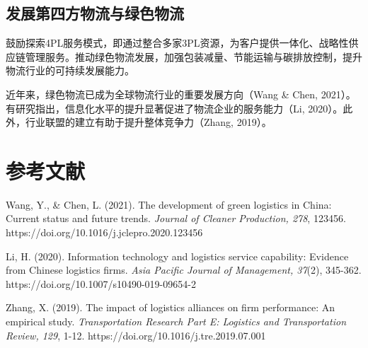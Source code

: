 \documentclass[UTF-8]{CUFEpaper}
\begin{document}
\subsection{发展第四方物流与绿色物流}
鼓励探索4PL服务模式，即通过整合多家3PL资源，为客户提供一体化、战略性供应链管理服务。推动绿色物流发展，加强包装减量、节能运输与碳排放控制，提升物流行业的可持续发展能力。\par
近年来，绿色物流已成为全球物流行业的重要发展方向（Wang \& Chen, 2021）。有研究指出，信息化水平的提升显著促进了物流企业的服务能力（Li, 2020）。此外，行业联盟的建立有助于提升整体竞争力（Zhang, 2019）。

\clearpage
{}
{}  %

\section*{参考文献}
\begingroup
\renewcommand{\section}[2]{} %
\begin{thebibliography}{99}
\makeatletter
\renewcommand{\@biblabel}[1]{[#1]. }
\makeatother
\vspace{12pt}

Wang, Y., \& Chen, L. (2021). The development of green logistics in China: Current status and future trends. \textit{Journal of Cleaner Production, 278}, 123456. https://doi.org/10.1016/j.jclepro.2020.123456

Li, H. (2020). Information technology and logistics service capability: Evidence from Chinese logistics firms. \textit{Asia Pacific Journal of Management, 37}(2), 345-362. https://doi.org/10.1007/s10490-019-09654-2

Zhang, X. (2019). The impact of logistics alliances on firm performance: An empirical study. \textit{Transportation Research Part E: Logistics and Transportation Review, 129}, 1-12. https://doi.org/10.1016/j.tre.2019.07.001
\end{thebibliography}
\endgroup
\end{document}
